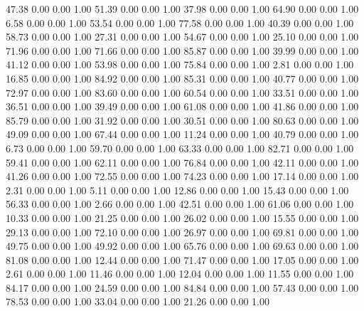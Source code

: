    47.38   0.00   0.00   1.00
   51.39   0.00   0.00   1.00
   37.98   0.00   0.00   1.00
   64.90   0.00   0.00   1.00
    6.58   0.00   0.00   1.00
   53.54   0.00   0.00   1.00
   77.58   0.00   0.00   1.00
   40.39   0.00   0.00   1.00
   58.73   0.00   0.00   1.00
   27.31   0.00   0.00   1.00
   54.67   0.00   0.00   1.00
   25.10   0.00   0.00   1.00
   71.96   0.00   0.00   1.00
   71.66   0.00   0.00   1.00
   85.87   0.00   0.00   1.00
   39.99   0.00   0.00   1.00
   41.12   0.00   0.00   1.00
   53.98   0.00   0.00   1.00
   75.84   0.00   0.00   1.00
    2.81   0.00   0.00   1.00
   16.85   0.00   0.00   1.00
   84.92   0.00   0.00   1.00
   85.31   0.00   0.00   1.00
   40.77   0.00   0.00   1.00
   72.97   0.00   0.00   1.00
   83.60   0.00   0.00   1.00
   60.54   0.00   0.00   1.00
   33.51   0.00   0.00   1.00
   36.51   0.00   0.00   1.00
   39.49   0.00   0.00   1.00
   61.08   0.00   0.00   1.00
   41.86   0.00   0.00   1.00
   85.79   0.00   0.00   1.00
   31.92   0.00   0.00   1.00
   30.51   0.00   0.00   1.00
   80.63   0.00   0.00   1.00
   49.09   0.00   0.00   1.00
   67.44   0.00   0.00   1.00
   11.24   0.00   0.00   1.00
   40.79   0.00   0.00   1.00
    6.73   0.00   0.00   1.00
   59.70   0.00   0.00   1.00
   63.33   0.00   0.00   1.00
   82.71   0.00   0.00   1.00
   59.41   0.00   0.00   1.00
   62.11   0.00   0.00   1.00
   76.84   0.00   0.00   1.00
   42.11   0.00   0.00   1.00
   41.26   0.00   0.00   1.00
   72.55   0.00   0.00   1.00
   74.23   0.00   0.00   1.00
   17.14   0.00   0.00   1.00
    2.31   0.00   0.00   1.00
    5.11   0.00   0.00   1.00
   12.86   0.00   0.00   1.00
   15.43   0.00   0.00   1.00
   56.33   0.00   0.00   1.00
    2.66   0.00   0.00   1.00
   42.51   0.00   0.00   1.00
   61.06   0.00   0.00   1.00
   10.33   0.00   0.00   1.00
   21.25   0.00   0.00   1.00
   26.02   0.00   0.00   1.00
   15.55   0.00   0.00   1.00
   29.13   0.00   0.00   1.00
   72.10   0.00   0.00   1.00
   26.97   0.00   0.00   1.00
   69.81   0.00   0.00   1.00
   49.75   0.00   0.00   1.00
   49.92   0.00   0.00   1.00
   65.76   0.00   0.00   1.00
   69.63   0.00   0.00   1.00
   81.08   0.00   0.00   1.00
   12.44   0.00   0.00   1.00
   71.47   0.00   0.00   1.00
   17.05   0.00   0.00   1.00
    2.61   0.00   0.00   1.00
   11.46   0.00   0.00   1.00
   12.04   0.00   0.00   1.00
   11.55   0.00   0.00   1.00
   84.17   0.00   0.00   1.00
   24.59   0.00   0.00   1.00
   84.84   0.00   0.00   1.00
   57.43   0.00   0.00   1.00
   78.53   0.00   0.00   1.00
   33.04   0.00   0.00   1.00
   21.26   0.00   0.00   1.00

